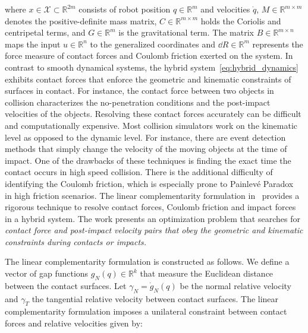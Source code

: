 \noindent where $x \in \mathcal{X} \subset \mathbb{R}^{2m}$ consists of robot
position $q \in \mathbb{R}^m$ and velocities $\dot{q}$, $M \in \mathbb{R}^{m
\times m}$ denotes the positive-definite mass matrix, $C \in \mathbb{R}^{m
\times m}$ holds the Coriolis and centripetal terms, and $G \in \mathbb{R}^{m}$
is the gravitational term. The matrix $B \in \mathbb{R}^{m \times n}$ maps the
input $u \in \mathbb{R}^{n}$ to the generalized coordinates and $\dd R \in
\mathbb{R}^m$ represents the force measure of contact forces and Coulomb
friction exerted on the system. 
%
%
In contrast to smooth dynamical systems, the hybrid
system~\eqref{eq:hybrid_dynamics} exhibits contact forces that enforce
the geometric and kinematic constraints of surfaces in contact.
%
For instance, the contact force between two objects in collision characterizes
the no-penetration conditions and the post-impact velocities of the objects.
%
Resolving these contact forces accurately can be difficult and computationally
expensive.
%
Most collision simulators work on the kinematic level as opposed to the dynamic
level.
%
For instance, there are event detection methods that simply change the velocity
of the moving objects at the time of impact.
%
One of the drawbacks of these techniques is finding the exact time the contact
occurs in high speed collision.
%
There is the additional difficulty of identifying the Coulomb friction, which is
especially prone to Painlev{{\'e}} Paradox~\cite{genot1999new} in high friction
scenarios.
%
The linear complementarity formulation in~\cite{glocker2005formulation} provides
a rigorous technique to resolve contact forces, Coulomb friction and impact
forces in a hybrid system.
%
The work presents an optimization problem that searches for \it{contact force
and post-impact velocity} \normalfont pairs that obey the geometric and
kinematic constraints during contacts or impacts.
%

%
The linear complementarity formulation is constructed as follows. We define a
vector of gap functions $g_N(q) \in \mathbb{R}^{k}$ that measure the
Euclidean distance between the contact surfaces. 
%
Let $\gamma_N = \dot{g}_N(q)$ be the normal relative velocity and
$\gamma_T$ the tangential relative velocity between contact surfaces.
%
The linear complementarity formulation imposes a unilateral constraint between
contact forces and relative velocities given by:


